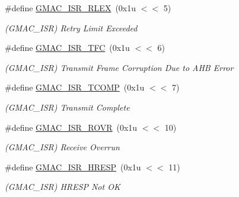 \begin{DoxyCompactItemize}
\mbox{\label{group__SAME70__GMAC_gaac419db37253ffbfe888d1216539c54f}} 
\#define \mbox{\hyperlink{group__SAME70__GMAC_gaac419db37253ffbfe888d1216539c54f}{G\+M\+A\+C\+\_\+\+I\+S\+R\+\_\+\+R\+L\+EX}}~(0x1u $<$$<$ 5)
\begin{DoxyCompactList}\small\item\em (G\+M\+A\+C\+\_\+\+I\+SR) Retry Limit Exceeded \end{DoxyCompactList}\item 
\mbox{\label{group__SAME70__GMAC_ga67779dcadc46634f3931f53a58b5a00c}} 
\#define \mbox{\hyperlink{group__SAME70__GMAC_ga67779dcadc46634f3931f53a58b5a00c}{G\+M\+A\+C\+\_\+\+I\+S\+R\+\_\+\+T\+FC}}~(0x1u $<$$<$ 6)
\begin{DoxyCompactList}\small\item\em (G\+M\+A\+C\+\_\+\+I\+SR) Transmit Frame Corruption Due to A\+HB Error \end{DoxyCompactList}\item 
\mbox{\label{group__SAME70__GMAC_gab3b94f755dfbef73b55a5f7ff8ce4604}} 
\#define \mbox{\hyperlink{group__SAME70__GMAC_gab3b94f755dfbef73b55a5f7ff8ce4604}{G\+M\+A\+C\+\_\+\+I\+S\+R\+\_\+\+T\+C\+O\+MP}}~(0x1u $<$$<$ 7)
\begin{DoxyCompactList}\small\item\em (G\+M\+A\+C\+\_\+\+I\+SR) Transmit Complete \end{DoxyCompactList}\item 
\mbox{\label{group__SAME70__GMAC_ga07564af3de1886ce661d327a0fd8bd03}} 
\#define \mbox{\hyperlink{group__SAME70__GMAC_ga07564af3de1886ce661d327a0fd8bd03}{G\+M\+A\+C\+\_\+\+I\+S\+R\+\_\+\+R\+O\+VR}}~(0x1u $<$$<$ 10)
\begin{DoxyCompactList}\small\item\em (G\+M\+A\+C\+\_\+\+I\+SR) Receive Overrun \end{DoxyCompactList}\item 
\mbox{\label{group__SAME70__GMAC_ga24c8298ef226ae0f7f1c854905648273}} 
\#define \mbox{\hyperlink{group__SAME70__GMAC_ga24c8298ef226ae0f7f1c854905648273}{G\+M\+A\+C\+\_\+\+I\+S\+R\+\_\+\+H\+R\+E\+SP}}~(0x1u $<$$<$ 11)
\begin{DoxyCompactList}\small\item\em (G\+M\+A\+C\+\_\+\+I\+SR) H\+R\+E\+SP Not OK \end{DoxyCompactList}\item 
$$
\end{DoxyCompactItemize}
